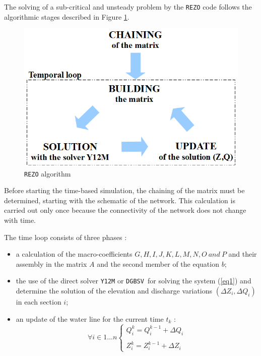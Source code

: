 \vspace{0.5cm}

The solving of a sub-critical and unsteady problem by the \texttt{REZO} code follows the algorithmic stages described in Figure \ref{Etap}.

\begin{figure}[h]
 \begin{center}
  \includegraphics[scale=1.]{Figures/AlgoRezo.eps}
  \caption{\texttt{REZO} algorithm}
  \label{Etap}
 \end{center}
\end{figure}

Before starting the time-based simulation, the chaining of the matrix must be determined, starting with the schematic of the network. This calculation is carried out only once because the connectivity of the network does not change with time.

\vspace{0.5cm}

The time loop consists of three phases :
\begin{itemize}
 \item a calculation of the macro-coefficients $G, H, I, J, K, L, M, N, O\ and\ P$ and their assembly in the matrix $A$ and the second member of the equation $b$;
 \item the use of the direct solver \texttt{Y12M} or \texttt{DGBSV }for solving the system (\ref{eq1}) and determine the solution of the elevation and discharge variations $(\Delta Z_i,\Delta Q_i)$ in each section $i$;
 \item an update of the water line for the current time $t_k$ :
  \begin{equation}
   \forall i \in 1...n
   \left \lbrace
  \begin{array}{l}
    Q_{i}^{k} = Q_{i}^{k-1} + \Delta Q_i \\
    \\
    Z_{i}^{k} = Z_{i}^{k-1} + \Delta Z_i
  \end{array}
 \right.
  \end{equation}
\end{itemize}


